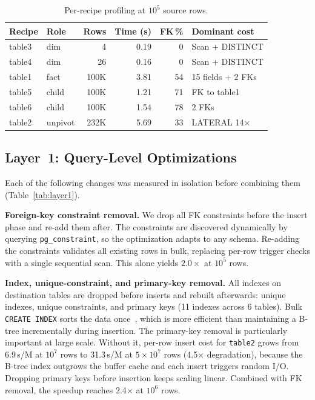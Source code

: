 \documentclass[journal]{IEEEtran}
\begin{document}
\begin{table}[!ht]
\centering
\caption{Per-recipe profiling at $10^5$ source rows.}
\label{tab:per_recipe}
\begin{tabular}{llrrrl}
\toprule
\textbf{Recipe} & \textbf{Role} & \textbf{Rows} & \textbf{Time (s)} & \textbf{FK\,\%} & \textbf{Dominant cost} \\
\midrule
table3 & dim   & 4      & 0.19  & 0   & Scan + DISTINCT \\
table4 & dim   & 26     & 0.16  & 0   & Scan + DISTINCT \\
table1 & fact  & 100K   & 3.81  & 54  & 15 fields + 2 FKs \\
table5 & child & 100K   & 1.21  & 71  & FK to table1 \\
table6 & child & 100K   & 1.54  & 78  & 2 FKs \\
table2 & unpivot & 232K & 5.69  & 33  & LATERAL 14$\times$ \\
\bottomrule
\end{tabular}
\end{table}

\subsection{Layer~1: Query-Level Optimizations}
\label{sec:layer1}

Each of the following changes was measured in isolation before combining them (Table~\ref{tab:layer1}).

\textbf{Foreign-key constraint removal.}
We drop all FK constraints before the insert phase and re-add them after.
The constraints are discovered dynamically by querying \texttt{pg\_constraint}, so the optimization adapts to any schema.
Re-adding the constraints validates all existing rows in bulk, replacing per-row trigger checks with a single sequential scan.
This alone yields $2.0\times$ at $10^5$ rows.

\textbf{Index, unique-constraint, and primary-key removal.}
All indexes on destination tables are dropped before inserts and rebuilt afterwards: unique indexes, unique constraints, and primary keys (11 indexes across 6 tables).
Bulk \texttt{CREATE INDEX} sorts the data once~\cite{graefe2006sorting}, which is more efficient than maintaining a B-tree incrementally during insertion.
The primary-key removal is particularly important at large scale.
Without it, per-row insert cost for \texttt{table2} grows from 6.9\,s/M at $10^7$ rows to 31.3\,s/M at $5 \times 10^7$ rows (4.5$\times$ degradation), because the B-tree index outgrows the buffer cache and each insert triggers random I/O.
Dropping primary keys before insertion keeps scaling linear.
Combined with FK removal, the speedup reaches 2.4$\times$ at $10^6$ rows.
\end{document}

